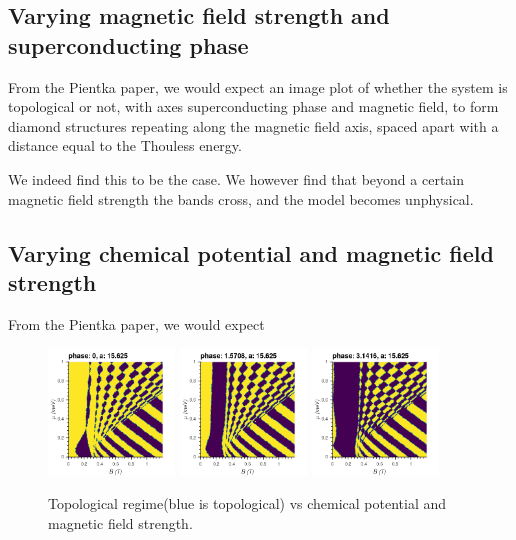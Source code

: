 \documentclass[10pt,a4paper]{article}
\begin{document}
	\subsection{Varying magnetic field strength and superconducting phase}
		From the Pientka paper, we would expect an image plot of whether the system is topological or not, with axes superconducting phase and magnetic field, to form diamond structures repeating along the magnetic field axis, spaced apart with a distance equal to the Thouless energy.
		
		We indeed find this to be the case. We however find that beyond a certain magnetic field strength the bands cross, and the model becomes unphysical.
	\subsection{Varying chemical potential and magnetic field strength}
		From the Pientka paper, we would expect 
			\begin{figure}[H]
				\includegraphics[width=0.3\textwidth]{muB0.png}
				\includegraphics[width=0.3\textwidth]{muB5.png}
				\includegraphics[width=0.3\textwidth]{muB1.png}
				\caption{Topological regime(blue is topological) vs chemical potential and magnetic field strength.}
			\end{figure}
\end{document}
